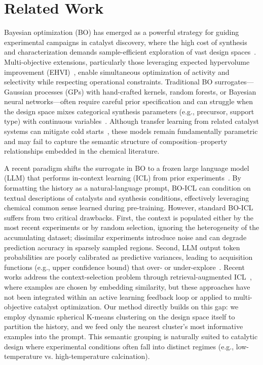\documentclass{article}
\begin{document}
\section{Related Work}

Bayesian optimization (BO) has emerged as a powerful strategy for guiding experimental campaigns in catalyst discovery, where the high cost of synthesis and characterization demands sample-efficient exploration of vast design spaces~\cite{shah2023autonomous, hase2018chemos}. Multi-objective extensions, particularly those leveraging expected hypervolume improvement (EHVI)~\cite{emmerich2011hypervolume, daulton2020differentiable}, enable simultaneous optimization of activity and selectivity while respecting operational constraints. Traditional BO surrogates—Gaussian processes (GPs) with hand-crafted kernels, random forests, or Bayesian neural networks—often require careful prior specification and can struggle when the design space mixes categorical synthesis parameters (e.g., precursor, support type) with continuous variables~\cite{torres2020accelerated, burger2020design}. Although transfer learning from related catalyst systems can mitigate cold starts~\cite{yamada2022transfer}, these models remain fundamentally parametric and may fail to capture the semantic structure of composition–property relationships embedded in the chemical literature.

A recent paradigm shifts the surrogate in BO to a frozen large language model (LLM) that performs in-context learning (ICL) from prior experiments~\cite{muller2023incontext, gruver2024llms}. By formatting the history as a natural-language prompt, BO-ICL can condition on textual descriptions of catalysts and synthesis conditions, effectively leveraging chemical common sense learned during pre-training. However, standard BO-ICL suffers from two critical drawbacks. First, the context is populated either by the most recent experiments or by random selection, ignoring the heterogeneity of the accumulating dataset; dissimilar experiments introduce noise and can degrade prediction accuracy in sparsely sampled regions. Second, LLM output token probabilities are poorly calibrated as predictive variances, leading to acquisition functions (e.g., upper confidence bound) that over- or under-explore~\cite{kadavath2022language, guo2017calibration}. Recent works address the context-selection problem through retrieval-augmented ICL~\cite{liu2023make, xie2024contextclustering}, where examples are chosen by embedding similarity, but these approaches have not been integrated within an active learning feedback loop or applied to multi-objective catalyst optimization. Our method directly builds on this gap: we employ dynamic spherical K-means clustering on the design space itself to partition the history, and we feed only the nearest cluster’s most informative examples into the prompt. This semantic grouping is naturally suited to catalytic design where experimental conditions often fall into distinct regimes (e.g., low-temperature vs. high-temperature calcination).
\end{document}
